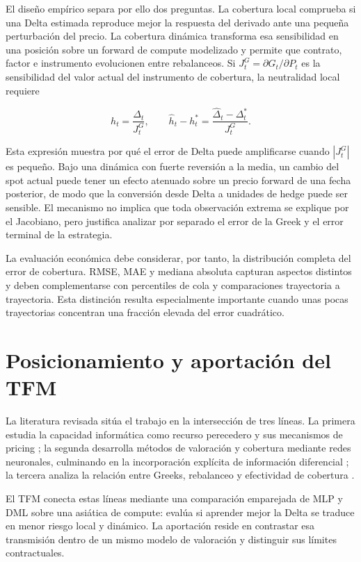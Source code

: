 El diseño empírico separa por ello dos preguntas. La cobertura local comprueba si
una Delta estimada reproduce mejor la respuesta del derivado ante una pequeña
perturbación del precio. La cobertura dinámica transforma esa sensibilidad en una
posición sobre un forward de compute modelizado y permite que contrato, factor e
instrumento evolucionen entre rebalanceos. Si
$J_t^G=\partial G_t/\partial P_t$ es la sensibilidad del valor actual del
instrumento de cobertura, la neutralidad local requiere

\begin{equation}
    h_t=\frac{\Delta_t}{J_t^G},
    \qquad
    \widehat h_t-h_t^*
    =
    \frac{\widehat\Delta_t-\Delta_t^*}{J_t^G}.
    \label{eq:forward_hedge_ratio_lit}
\end{equation}

Esta expresión muestra por qué el error de Delta puede amplificarse cuando
$|J_t^G|$ es pequeño. Bajo una dinámica con fuerte reversión a la media, un cambio
del spot actual puede tener un efecto atenuado sobre un precio forward de una fecha
posterior, de modo que la conversión desde Delta a unidades de hedge puede ser
sensible. El mecanismo no implica que toda observación extrema se explique por el
Jacobiano, pero justifica analizar por separado el error de la Greek y el error
terminal de la estrategia.

La evaluación económica debe considerar, por tanto, la distribución completa del
error de cobertura. RMSE, MAE y mediana absoluta capturan aspectos distintos y
deben complementarse con percentiles de cola y comparaciones trayectoria a
trayectoria. Esta distinción resulta especialmente importante cuando unas pocas
trayectorias concentran una fracción elevada del error cuadrático.

\section{Posicionamiento y aportación del TFM}
\label{sec:positioning_contribution}

La literatura revisada sitúa el trabajo en la intersección de tres líneas. La
primera estudia la capacidad informática como recurso perecedero y sus mecanismos de
pricing \cite{xu2013dynamiccloud,li2016spotpricing,wu2019cloudpricing}; la segunda
desarrolla métodos de valoración y cobertura mediante redes neuronales, culminando
en la incorporación explícita de información diferencial
\cite{hutchinson1994,huge_savine_2020}; la tercera analiza la relación entre Greeks,
rebalanceo y efectividad de cobertura
\cite{boyle_emanuel_1980,ederington1979,anderson_danthine_1981}.

El TFM conecta estas líneas mediante una comparación emparejada de MLP y DML
sobre una asiática de compute: evalúa si aprender mejor la Delta se traduce en
menor riesgo local y dinámico. La aportación reside en contrastar esa transmisión
dentro de un mismo modelo de valoración y distinguir sus límites contractuales.
